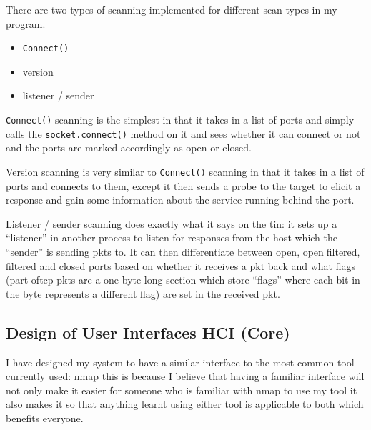 \documentclass[titlepage]{article}
\let\Oldsubsection\subsection{}
\renewcommand{\subsection}{\FloatBarrier\Oldsubsection}
\begin{document}
There are two types of scanning implemented for different scan types in my program.
\begin{itemize}
  \item{\verb|Connect()|}
  \item{version}
  \item{listener / sender}
\end{itemize}
\verb|Connect()| scanning is the simplest in that it takes in a list of \glspl{port} and simply calls the
\verb|socket.connect()| method on it and sees whether it can connect or not and the \glspl{port} are
marked accordingly as open or closed.

Version scanning is very similar to \verb|Connect()| scanning in that it takes in a list of \glspl{port}
and connects to them, except it then sends a probe to the target to elicit a response and gain
some information about the \gls{service} running behind the \gls{port}.

Listener / sender scanning does exactly what it says on the tin: it sets up a ``listener'' in another process
to listen for responses from the host which the ``sender'' is sending \glspl{pkt} to. It can then differentiate
between open, open|filtered, filtered and closed \glspl{port} based on whether it receives a \gls{pkt} back
and what flags (part of\gls{tcp} \glspl{pkt} are a one byte long section which store ``flags'' where each bit in the
byte represents a different flag) are set in the received \gls{pkt}.

\subsection{Design of User Interfaces HCI (Core)}

I have designed my system to have a similar interface to the most common tool currently used: nmap
this is because I believe that having a familiar interface will not only make it easier for someone who
is familiar with nmap to use my tool it also makes it so that anything learnt using either tool is applicable
to both which benefits everyone.
\end{document}
